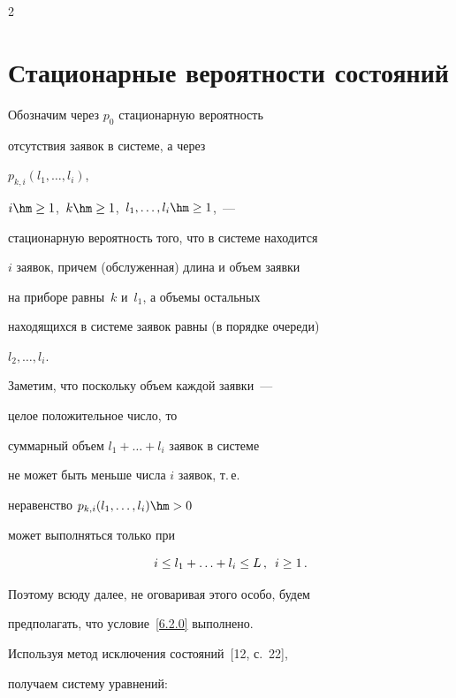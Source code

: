 \begin{multicols}{2}
\section{Стационарные вероятности состояний}





Обозначим через $p_0$ стационарную вероятность


отсутствия заявок в сис\-те\-ме, а через


$p_{k,i}(l_1,\ldots,l_i)$,\ 


$i \hm\ge 1$,\  $k\hm\ge 1$,\  $l_1,\ldots,l_i \hm\ge 1$,~---


стационарную вероятность того, что в сис\-те\-ме находится


$i$ заявок, причем (обслуженная) длина и объем заявки


на приборе равны~$k$ и~$l_1$, а объемы остальных


находящихся в сис\-те\-ме заявок равны (в порядке очереди)


$l_2,\ldots,l_i$.





Заметим, что поскольку объем каждой заявки~---


целое положительное чис\-ло, то


суммарный объем $l_1 +\ldots+ l_i$ заявок в системе


не может быть меньше числа $i$ заявок, т.\,е.\


неравенство $p_{k,i}(l_1,\ldots,l_i) \hm> 0$


может выполняться только при


\begin{equation}


\label{6.2.0}


i\le l_1 +\ldots+ l_i \le L


\,,\enskip i \ge 1\,.


\end{equation}


Поэтому всюду далее, не оговаривая этого особо, будем


предполагать, что условие~\eqref{6.2.0} выполнено.





Используя метод исключения состояний~[12, с.~22],


получаем сис\-те\-му урав\-нений:


\begin{multline}



\end{multline}
\end{multicols}
